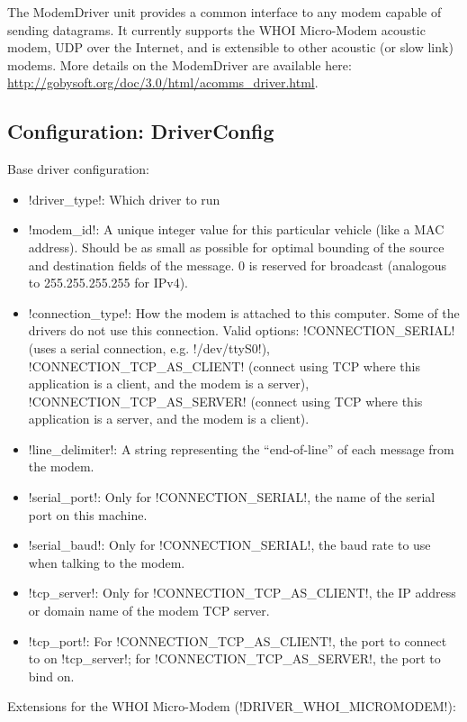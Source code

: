 The ModemDriver unit provides a common interface to any modem capable of sending datagrams. It currently supports the WHOI Micro-Modem acoustic modem, UDP over the Internet, and is extensible to other acoustic (or slow link) modems. More details on the ModemDriver are available here: \url{http://gobysoft.org/doc/3.0/html/acomms_driver.html}.

\subsection{Configuration: DriverConfig}

Base driver configuration:

\resetbvlinenumber

\begin{itemize}
\item !driver_type!: Which driver to run
\item !modem_id!: A unique integer value for this particular vehicle (like a MAC address). Should be as small as possible for optimal bounding of the source and destination fields of the message. 0 is reserved for broadcast (analogous to 255.255.255.255 for IPv4).
\item !connection_type!: How the modem is attached to this computer. Some of the drivers do not use this connection. Valid options: !CONNECTION_SERIAL! (uses a serial connection, e.g. !/dev/ttyS0!), !CONNECTION_TCP_AS_CLIENT! (connect using TCP where this application is a client, and the modem is a server), !CONNECTION_TCP_AS_SERVER! (connect using TCP where this application is a server, and the modem is a client).
\item !line_delimiter!: A string representing the ``end-of-line'' of each message from the modem.
\item !serial_port!: Only for !CONNECTION_SERIAL!, the name of the serial port on this machine.
\item !serial_baud!: Only for !CONNECTION_SERIAL!, the baud rate to use when talking to the modem.
\item !tcp_server!: Only for !CONNECTION_TCP_AS_CLIENT!, the IP address or domain name of the modem TCP server.
\item !tcp_port!: For !CONNECTION_TCP_AS_CLIENT!, the port to connect to on !tcp_server!; for !CONNECTION_TCP_AS_SERVER!, the port to bind on.
\end{itemize} 

Extensions for the WHOI Micro-Modem (!DRIVER_WHOI_MICROMODEM!):
\resetbvlinenumber

